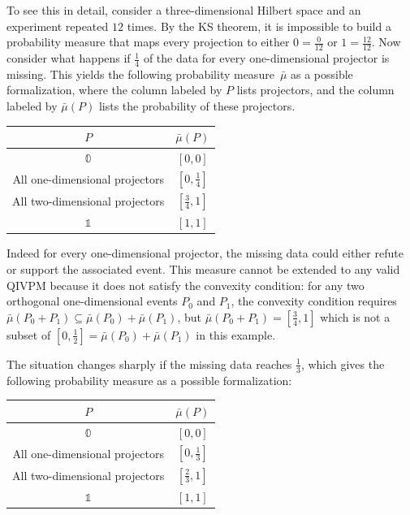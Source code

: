 \documentclass[english,reprint, aps, prl,superscriptaddress, showpacs,
showkeys, longbibliography, amsmath, amssymb, floatfix]{revtex4-1}
\theoremstyle{plain}
\theoremstyle{definition}
\newcommand{\imposs}{\ensuremath{\left[0,0\right]}}
\newcommand{\necess}{\ensuremath{\left[1,1\right]}}
\begin{document}
To see this in detail, consider a three-dimensional Hilbert space
and an experiment repeated $12$ times. By the KS theorem, it is impossible
to build a probability measure that maps every projection to either
$0=\frac{0}{12}$ or $1=\frac{12}{12}$. Now consider what happens
if $\frac{1}{4}$ of the data for every one-dimensional projector
is missing. This yields the following probability measure~$\bar{\mu}$
as a possible formalization, where the column labeled by $P$ lists
projectors, and the column labeled by $\bar{\mu}\left(P\right)$ lists
the probability of these projectors.
\begin{center}
\begin{tabular}{cc}
\toprule 
\addlinespace
$P$  & $\bar{\mu}\left(P\right)$\tabularnewline
\midrule
\midrule 
\addlinespace
$\mathbb{0}$ & $\imposs$\tabularnewline
\midrule 
\addlinespace
All one-dimensional projectors & $\left[0,\tfrac{1}{4}\right]$\tabularnewline
\midrule 
\addlinespace
All two-dimensional projectors & $\left[\tfrac{3}{4},1\right]$\tabularnewline
\midrule 
\addlinespace
$\mathbb{1}$ & $\necess$\tabularnewline
\bottomrule
\end{tabular}
\par\end{center}

\noindent Indeed for every one-dimensional projector, the missing
data could either refute or support the associated event. This measure
cannot be extended to any valid QIVPM because it does not satisfy
the convexity condition: for any two orthogonal one-dimensional events
$P_{0}$ and $P_{1}$, the convexity condition requires $\bar{\mu}\left(P_{0}+P_{1}\right)\subseteq\bar{\mu}\left(P_{0}\right)+\bar{\mu}\left(P_{1}\right)$,
but $\bar{\mu}\left(P_{0}+P_{1}\right)=\left[\tfrac{3}{4},1\right]$
which is not a subset of $\left[0,\tfrac{1}{2}\right]=\bar{\mu}\left(P_{0}\right)+\bar{\mu}\left(P_{1}\right)$
in this example.

The situation changes sharply if the missing data reaches $\frac{1}{3}$,
which gives the following probability measure as a possible formalization:
\begin{center}
\begin{tabular}{cc}
\toprule 
\addlinespace
$P$  & $\bar{\mu}\left(P\right)$\tabularnewline
\midrule
\midrule 
\addlinespace
$\mathbb{0}$ & $\imposs$\tabularnewline
\midrule 
\addlinespace
All one-dimensional projectors & $\left[0,\tfrac{1}{3}\right]$\tabularnewline
\midrule 
\addlinespace
All two-dimensional projectors & $\left[\tfrac{2}{3},1\right]$\tabularnewline
\midrule 
\addlinespace
$\mathbb{1}$ & $\necess$\tabularnewline
\bottomrule
\end{tabular}
\par\end{center}
\end{document}

